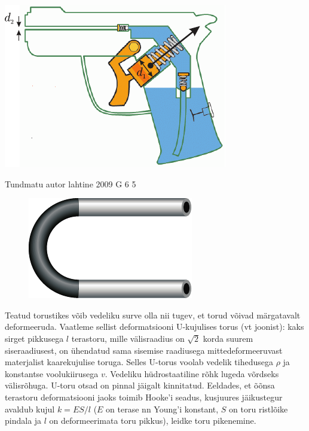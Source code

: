 \documentclass[11pt, twoside]{article}
\begin{document}
{{\begin{center}
	\includegraphics[width=0.6\linewidth]{2006-v3g-04-yl}
\end{center}
\fi
}

{Tundmatu autor} %
{lahtine} %
{2009} %
{G 6} %
{5} %
{
\ifStatement
\begin{figure}
	\begin{center}
		\vspace{-15pt}
		\includegraphics[width=\linewidth]{2009-lahg-06-yl}
	\end{center}
\end{figure}
Teatud torustikes võib vedeliku surve olla nii tugev, et torud võivad märgatavalt deformeeruda. Vaatleme sellist deformatsiooni U-kujulises torus (vt joonist): kaks sirget pikkusega $l$ terastoru, mille välisraadius on $\sqrt 2$ korda suurem siseraadiusest, on ühendatud sama sisemise raadiusega mittedeformeeruvast materjalist kaarekujulise toruga. Selles U-torus voolab vedelik tihedusega $\rho$ ja konstantse voolukiirusega $v$. Vedeliku hüdrostaatiline rõhk lugeda võrdseks välisrõhuga. U-toru otsad on pinnal jäigalt kinnitatud. Eeldades, et õõnsa terastoru deformatsiooni jaoks toimib Hooke’i seadus, kusjuures jäikustegur avaldub kujul $k = ES/l$ ($E$ on terase nn Young’i konstant, $S$ on toru ristlõike pindala ja $l$ on deformeerimata toru pikkus), leidke toru pikenemine.
\fi
}

}
\end{document}
